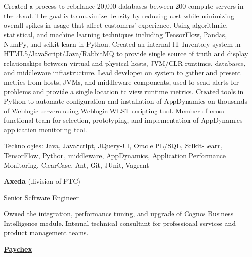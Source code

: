 \documentclass[letterpaper,MMMMyyyy,nonstopmode]{simpleresumecv}
\newif\ifLOCATION
\newif\ifLONG
\begin{document}
\begin{Body}
\begin{Detail}
\BulletItem
Created a process to rebalance 20,000 databases between 200 compute servers in the cloud. The goal is to maximize density by reducing cost while minimizing overall spikes in usage that affect customers' experience. Using algorithmic, statistical, and machine learning techniques including TensorFlow, Pandas, NumPy, and scikit-learn in Python.
\BulletItem
Created an internal IT Inventory system in HTML5/JavaScript/Java/RabbitMQ to provide single source of truth and display relationships between virtual and physical hosts, JVM/CLR runtimes, databases, and middleware infrastructure.
\BulletItem
Lead developer on system to gather and present metrics from hosts, JVMs, and middleware components, used to send alerts for problems and provide a single location to view runtime metrics.
\BulletItem
Created tools in Python to automate configuration and installation of AppDynamics on thousands of Weblogic servers using Weblogic WLST scripting tool.
\BulletItem
Member of cross-functional team for selection, prototyping, and implementation of AppDynamics application monitoring tool. 

\Gap
Technologies: Java, JavaScript, JQuery-UI, Oracle PL/SQL, Scikit-Learn, TensorFlow, Python, middleware, AppDynamics, Application Performance Monitoring, ClearCase, Ant, Git, JUnit, Vagrant
\end{Detail}
\fi

\BigGap

\Entry
\textbf{Axeda} (division of PTC)
\hfill 
 --  

Senior Software Engineer
\ifLOCATION
\hfill
Rochester, New York
\fi

\begin{Detail}
\BulletItem
Owned the integration, performance tuning, and upgrade of Cognos Business Intelligence module.
\BulletItem
Internal technical consultant for professional services and product management teams.

\end{Detail}

\ifLONG

\BigGap
\Entry
\href{http://www.paychex.com/}
{\textbf{Paychex}}
\hfill 
 -- 


\end{Body}
\end{document}
